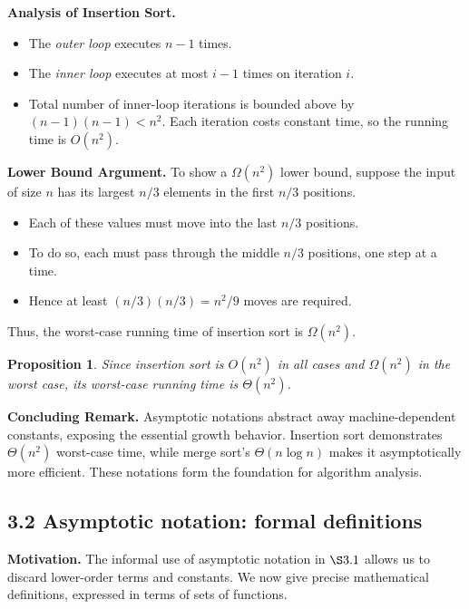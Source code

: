 \documentclass[12pt]{article}
\newtheorem{proposition}[theorem]{Proposition}
\theoremstyle{definition}
\begin{document}
\noindent
\textbf{Analysis of Insertion Sort.}  
\begin{itemize}
    \item The \emph{outer loop} executes $n-1$ times.  
    \item The \emph{inner loop} executes at most $i-1$ times on iteration $i$.  
    \item Total number of inner-loop iterations is bounded above by $(n-1)(n-1) < n^2$. Each iteration costs constant time, so the running time is $O(n^2)$.  
\end{itemize}

\noindent
\textbf{Lower Bound Argument.}  
To show a $\Omega(n^2)$ lower bound, suppose the input of size $n$ has its largest $n/3$ elements in the first $n/3$ positions.  
\begin{itemize}
    \item Each of these values must move into the last $n/3$ positions.  
    \item To do so, each must pass through the middle $n/3$ positions, one step at a time.  
    \item Hence at least $(n/3)(n/3) = n^2/9$ moves are required.  
\end{itemize}
Thus, the worst-case running time of insertion sort is $\Omega(n^2)$.  

\begin{proposition}
Since insertion sort is $O(n^2)$ in all cases and $\Omega(n^2)$ in the worst case, its worst-case running time is $\Theta(n^2)$.  
\end{proposition}

\noindent
\textbf{Concluding Remark.}  
Asymptotic notations abstract away machine-dependent constants, exposing the essential growth behavior. Insertion sort demonstrates $\Theta(n^2)$ worst-case time, while merge sort’s $\Theta(n \log n)$ makes it asymptotically more efficient. These notations form the foundation for algorithm analysis.  

\newpage

\subsection*{3.2 Asymptotic notation: formal definitions\vspace{1em}\\}

\noindent
\textbf{Motivation.}  
The informal use of asymptotic notation in $\S 3.1$ allows us to discard lower-order terms and constants. We now give precise mathematical definitions, expressed in terms of sets of functions.  
\end{document}
